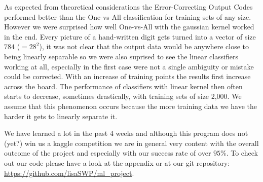 \smallskip
As expected from theoretical considerations the Error-Correcting Output Codes performed better than the One-vs-All classification for training sets of any size. However we were surprised how well One-vs-All with the gaussian kernel worked in the end. Every picture of a hand-written digit gets turned into a vector of size $784$  ($=28^2$), it was not clear that the output data would be anywhere close to being linearly separable so we were also suprised to see the linear classifiers working at all, especially in the first case were not a single ambiguity or mistake could be corrected. With an increase of training points the results first increase across the board. The performance of classifiers with linear kernel then often starts to decrease, sometimes drastically, with training sets of size 2,000. We assume that this phenomenon occurs because the more training data we have the harder it gets to linearly separate it. 


\smallskip
We have learned a lot in the past 4 weeks and although this program does not (yet?) win us a kaggle competition we are in general very content with the overall outcome of the project and especially with our success rate of over $95$\%. To check out our code please have a look at the appendix or at our git repository:  \url{https://github.com/lisaSWP/ml_project}.

